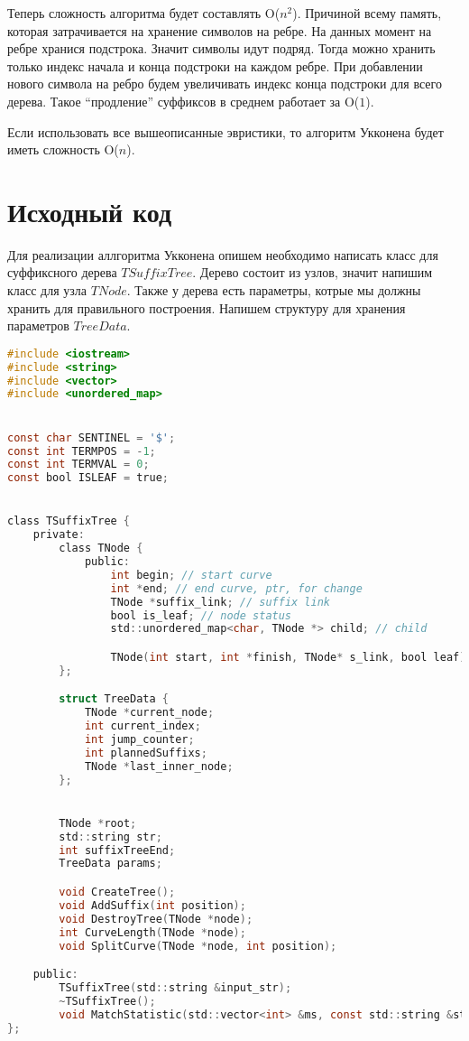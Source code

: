 Теперь сложность алгоритма будет составлять O($n^2$). Причиной всему память, которая затрачивается на хранение символов на ребре.
На данных момент на ребре хранися подстрока. Значит символы идут подряд. Тогда можно хранить только индекс начала 
и конца подстроки на каждом ребре. При добавлении нового символа на ребро будем увеличивать индекс конца подстроки для всего дерева.
Такое \enquote{продление} суффиксов в среднем работает за O($1$).

Если использовать все вышеописанные эвристики, то алгоритм Укконена будет иметь сложность O($n$).


\pagebreak

\section{Исходный код}
Для реализации аллгоритма Укконена опишем необходимо написать класс для суффиксного дерева $TSuffixTree$. Дерево состоит из узлов, 
значит напишим класс для узла $TNode$. Также у дерева есть параметры, котрые мы должны хранить для правильного построения.
Напишем структуру для хранения параметров $TreeData$. 



\begin{lstlisting}[language=C]
#include <iostream>
#include <string>
#include <vector>
#include <unordered_map>


const char SENTINEL = '$';
const int TERMPOS = -1;
const int TERMVAL = 0;
const bool ISLEAF = true;


class TSuffixTree {
    private:
        class TNode {
            public:
                int begin; // start curve
                int *end; // end curve, ptr, for change
                TNode *suffix_link; // suffix link
                bool is_leaf; // node status
                std::unordered_map<char, TNode *> child; // child

                TNode(int start, int *finish, TNode* s_link, bool leaf); // node constructor
        };

        struct TreeData {
            TNode *current_node; 
            int current_index;
            int jump_counter;
            int plannedSuffixs;
            TNode *last_inner_node;
        };


        TNode *root; 
        std::string str; 
        int suffixTreeEnd;
        TreeData params; 

        void CreateTree();
        void AddSuffix(int position); 
        void DestroyTree(TNode *node);
        int CurveLength(TNode *node);
        void SplitCurve(TNode *node, int position);

    public:
        TSuffixTree(std::string &input_str);
        ~TSuffixTree();
        void MatchStatistic(std::vector<int> &ms, const std::string &str); 
};
\end{lstlisting}

